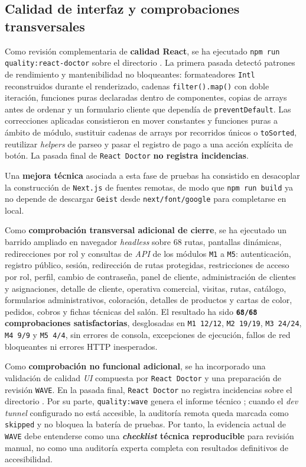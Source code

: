 \subsection{Calidad de interfaz y comprobaciones transversales}

Como revisión complementaria de \textbf{calidad React}, se ha ejecutado \texttt{npm run quality:react-doctor} sobre el directorio . La primera pasada detectó patrones de rendimiento y mantenibilidad no bloqueantes: formateadores \texttt{Intl} reconstruidos durante el renderizado, cadenas \texttt{filter().map()} con doble iteración, funciones puras declaradas dentro de componentes, copias de arrays antes de ordenar y un formulario cliente que dependía de \texttt{preventDefault}. Las correcciones aplicadas consistieron en mover constantes y funciones puras a ámbito de módulo, sustituir cadenas de arrays por recorridos únicos o \texttt{toSorted}, reutilizar \textit{helpers} de parseo y pasar el registro de pago a una acción explícita de botón. La pasada final de \texttt{React Doctor} \textbf{no registra incidencias}.

Una \textbf{mejora técnica} asociada a esta fase de pruebas ha consistido en desacoplar la construcción de \texttt{Next.js} de fuentes remotas, de modo que \texttt{npm run build} ya no depende de descargar \texttt{Geist} desde \texttt{next/font/google} para completarse en local.

Como \textbf{comprobación transversal adicional de cierre}, se ha ejecutado un barrido ampliado en navegador \textit{headless} sobre 68 rutas, pantallas dinámicas, redirecciones por rol y consultas de \textit{API} de los módulos \texttt{M1} a \texttt{M5}: autenticación, registro público, sesión, redirección de rutas protegidas, restricciones de acceso por rol, perfil, cambio de contraseña, panel de cliente, administración de clientes y asignaciones, detalle de cliente, operativa comercial, visitas, rutas, catálogo, formularios administrativos, coloración, detalles de productos y cartas de color, pedidos, cobros y fichas técnicas del salón. El resultado ha sido \textbf{\texttt{68/68} comprobaciones satisfactorias}, desglosadas en \texttt{M1 12/12}, \texttt{M2 19/19}, \texttt{M3 24/24}, \texttt{M4 9/9} y \texttt{M5 4/4}, sin errores de consola, excepciones de ejecución, fallos de red bloqueantes ni errores HTTP inesperados.

Como \textbf{comprobación no funcional adicional}, se ha incorporado una validación de calidad \textit{UI} compuesta por \texttt{React Doctor} y una preparación de revisión \texttt{WAVE}. En la pasada final, \texttt{React Doctor} no registra incidencias sobre el directorio . Por su parte, \texttt{quality:wave} genera el informe técnico ; cuando el \textit{dev tunnel} configurado no está accesible, la auditoría remota queda marcada como \texttt{skipped} y no bloquea la batería de pruebas. Por tanto, la evidencia actual de \texttt{WAVE} debe entenderse como una \textbf{\textit{checklist} técnica reproducible} para revisión manual, no como una auditoría experta completa con resultados definitivos de accesibilidad.

